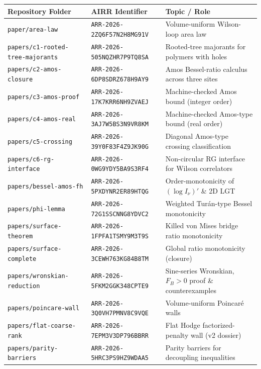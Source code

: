 \documentclass[11pt]{article}
\begin{document}
{\footnotesize
\begin{longtable}{@{}>{\raggedright\arraybackslash}p{}>{\raggedright\arraybackslash}p{}>{\raggedright\arraybackslash}p{}@{}}
\toprule
\textbf{Repository Folder} & \textbf{AIRR Identifier} & \textbf{Topic / Role} \\
\midrule
\endhead
\texttt{paper/area-law} & \texttt{ARR-2026-2ZQ6F57N2H8MG91V} & Volume-uniform Wilson-loop area law \\
\texttt{papers/c1-rooted-tree-majorants} & \texttt{ARR-2026-505NQZHR7P9TQ8SA} & Rooted-tree majorants for polymers with holes \\
\texttt{papers/c2-amos-closure} & \texttt{ARR-2026-6DP8SDRZ678H9AY9} & Amos Bessel-ratio calculus across three sites \\
\texttt{papers/c3-amos-proof} & \texttt{ARR-2026-17K7KRR6NH9ZVAEJ} & Machine-checked Amos bound (integer order) \\
\texttt{papers/c4-amos-real} & \texttt{ARR-2026-3AJ7W5BS3N9VR8KM} & Machine-checked Amos-type bound (real order) \\
\texttt{papers/c5-crossing} & \texttt{ARR-2026-39Y0F83F4Z9JK90G} & Diagonal Amos-type crossing classification \\
\texttt{papers/c6-rg-interface} & \texttt{ARR-2026-0WG9YDY5BA9S3RF4} & Non-circular RG interface for Wilson correlators \\
\texttt{papers/bessel-amos-fh} & \texttt{ARR-2026-5PXDYNR2ER89HTQG} & Order-monotonicity of $(\log I_\nu)'$ \& 2D LGT \\
\texttt{papers/phi-lemma} & \texttt{ARR-2026-72G1SSCNNG8YDVC2} & Weighted Tur\'an-type Bessel monotonicity \\
\texttt{papers/surface-theorem} & \texttt{ARR-2026-1FPFA1TSMY9M3T9S} & Killed von Mises bridge ratio monotonicity \\
\texttt{papers/surface-complete} & \texttt{ARR-2026-3CEWH763KG84B8TM} & Global ratio monotonicity (closure) \\
\texttt{papers/wronskian-reduction} & \texttt{ARR-2026-5FKM2GGK348CPTE9} & Sine-series Wronskian, $F_B>0$ proof \& counterexamples \\
\texttt{papers/poincare-wall} & \texttt{ARR-2026-3Q0VH7PMNV8C9VQE} & Volume-uniform Poincar\'e walls \\
\texttt{papers/flat-coarse-rank} & \texttt{ARR-2026-7EPM3V3DP796BBRR} & Flat Hodge factorized-penalty wall (v2 dossier) \\
\texttt{papers/parity-barriers} & \texttt{ARR-2026-5HRC3PS9HZ9WDAA5} & Parity barriers for decoupling inequalities \\

\end{longtable}}
\end{document}

